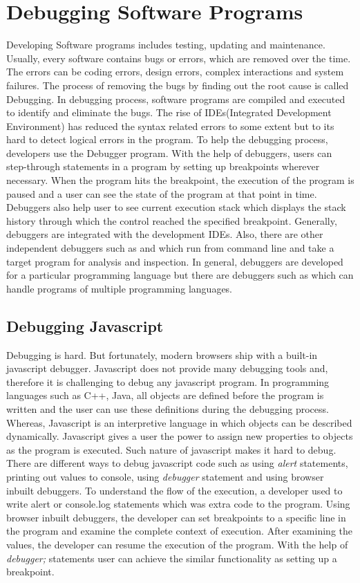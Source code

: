 \section{Debugging Software Programs}
Developing Software programs includes testing, updating and maintenance. Usually, every software contains bugs or errors, which are removed over the time. The errors can be coding errors, design errors, complex interactions and system failures. The process of removing the bugs by finding out the root cause is called Debugging. In debugging process, software programs are compiled and executed to identify and eliminate the bugs. The rise of IDEs(Integrated Development Environment) has reduced the syntax related errors to some extent but to its hard to detect logical errors in the program. To help the debugging process, developers use the Debugger program. With the help of debuggers, users can step-through statements in a program by setting up breakpoints wherever necessary. When the program hits the breakpoint, the execution of the program is paused and a user can see the state of the program at that point in time. Debuggers also help user to see current execution stack which displays the stack history through which the control reached the specified breakpoint. Generally, debuggers are integrated with the development IDEs. Also, there are other independent debuggers such as \cite{oracleDebugger} and \cite{gnuDebugger} which run from command line and take a target program for analysis and inspection. In general, debuggers are developed for a particular programming language but there are debuggers such as \cite{gnuDebugger} which can handle programs of multiple programming languages.

\subsection{Debugging Javascript}
Debugging is hard. But fortunately, modern browsers ship with a built-in javascript debugger. Javascript does not provide many debugging tools and, therefore it is challenging to debug any javascript program. In programming languages such as C++, Java, all objects are defined before the program is written and the user can use these definitions during the debugging process\cite{hoffman2000data}. Whereas, Javascript is an interpretive language in which objects can be described dynamically. Javascript gives a user the power to assign new properties to objects as the program is executed. Such nature of javascript makes it hard to debug. There are different ways to debug javascript code such as using \textit{alert} statements, printing out values to console, using \textit{debugger} statement and using browser inbuilt debuggers. To understand the flow of the execution, a developer used to write alert or console.log statements which was extra code to the program. Using browser inbuilt debuggers, the developer can set breakpoints to a specific line in the program and examine the complete context of execution. After examining the values, the developer can resume the execution of the program. With the help of \textit{debugger;} statements user can achieve the similar functionality as setting up a breakpoint. 

